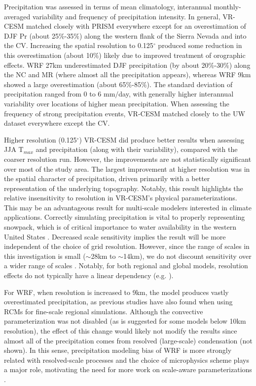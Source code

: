 \documentclass[draft,ms]{agutex}   %
\begin{document}
\begin{article}
Precipitation was assessed in terms of mean climatology, interannual monthly-averaged variability and frequency of precipitation intensity.  In general, VR-CESM matched closely with PRISM everywhere except for an  overestimation of DJF Pr (about 25$\%$-35$\%$) along the western flank of the Sierra Nevada and into the CV. Increasing the spatial resolution to 0.125$^\circ$ produced some reduction in this overestimation (about 10$\%$) likely due to improved treatment of orographic effects. WRF 27km underestimated DJF precipitation (by about 20$\%$-30$\%$) along the NC and MR (where almost all the precipitation appears), whereas WRF 9km showed a large overestimation (about 65$\%$-85$\%$). The standard deviation of precipitation ranged from 0 to 6 mm$/$day, with generally higher interannual variability over locations of higher mean precipitation. When assessing the frequency of strong precipitation events, VR-CESM matched closely to the UW dataset everywhere except the CV.

Higher resolution (0.125$^\circ$) VR-CESM did produce better results when assessing JJA T$_{max}$ and precipitation (along with their variability), compared with the coarser resolution run. However, the improvements are not statistically significant over most of the study area.  The largest improvement at higher resolution was in the spatial character of precipitation, driven primarily with a better representation of the underlying topography. Notably, this result highlights the relative insensitivity to resolution in VR-CESM's physical parameterizations. This may be an advantageous result for multi-scale modelers interested in climate applications. Correctly simulating precipitation is vital to properly representing snowpack, which is of critical importance to water availability in the western United States \citep{bales2006mountain, wise2012hydroclimatology, Rhoades2015Characterizing}. Decreased scale sensitivity implies the result will be more independent of the choice of grid resolution. However, since the range of scales in this investigation is small ($\sim$28km to $\sim$14km), we do not discount sensitivity over a wider range of scales \citep{wehner2010effect, rauscher2010resolution}. Notably, for both regional and global models, resolution effects do not typically have a linear dependency (e.g. \cite{hughes2014landfall, wehner2014effect}).

For WRF, when resolution is increased to 9km, the model produces vastly overestimated precipitation, as previous studies have also found when using RCMs for fine-scale regional simulations. Although the convective parameterization was not disabled (as is suggested for some models below 10km resolution), the effect of this change would likely not modify the results since almost all of the precipitation comes from resolved (large-scale) condensation (not shown). In this sense, precipitation modeling bias of WRF is more strongly related with resolved-scale processes and the choice of microphysics scheme plays a major role, motivating the need for more work on scale-aware parameterizations \citep{o2013observed}. 


\end{article}
\end{document}
